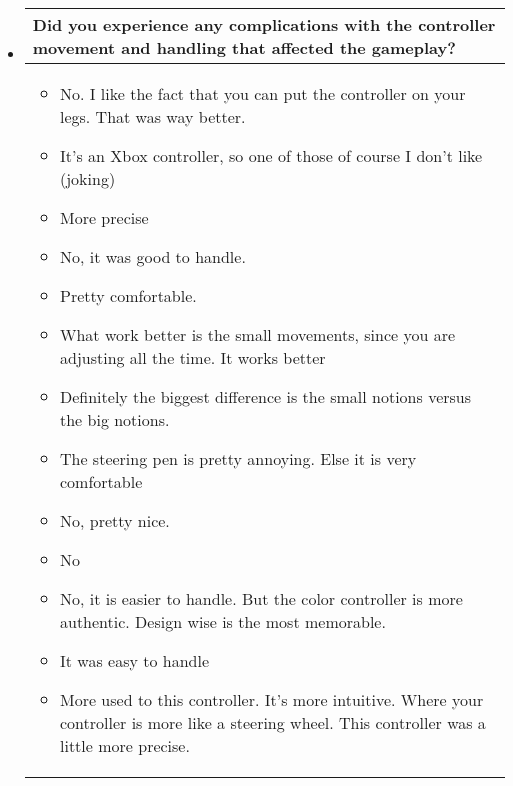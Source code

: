 \begin{itemize}
\item[]
\begin{table}[!htb]
\centering
\begin{tabular}{| p{5.5in} |}
\hline
	\cellcolor{NotSkyBlue}\textbf{Did you experience any complications with the controller movement and handling that affected the gameplay?}
	\\
	\hline
	\begin{itemize}
        \item No. I like the fact that you can put the controller on your legs. That was way better.
        \item It’s an Xbox controller, so one of those of course I don’t like (joking)
        \item More precise
        \item No, it was good to handle.
        \item Pretty comfortable.
        \item What work better is the small movements, since you are adjusting all the time. It works better
        \item Definitely the biggest difference is the small notions versus the big notions.
        \item The steering pen is pretty annoying. Else it is very comfortable
        \item No, pretty nice.
        \item No
        \item No, it is easier to handle. But the color controller is more authentic. Design wise is the most memorable.
        \item It was easy to handle
        \item More used to this controller. It’s more intuitive. Where your controller is more like  a steering wheel. This controller was a little more precise.

	\end{itemize}
	\\
	\hline
\end{tabular}
\end{table}

\end{itemize}